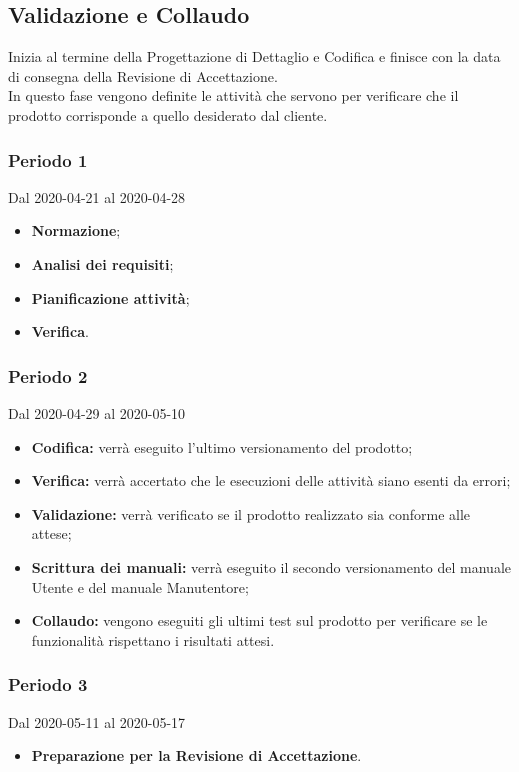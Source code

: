 \subsection{Validazione e Collaudo}
Inizia al termine della Progettazione di Dettaglio e Codifica e finisce con la data di consegna della Revisione di Accettazione.
\\In questo fase vengono definite le attività che servono per verificare che il prodotto corrisponde a quello desiderato dal cliente.
\subsubsection{Periodo 1} 
Dal 2020-04-21 al 2020-04-28
\begin{itemize}
	\item \textbf{Normazione};
	\item \textbf{Analisi dei requisiti};
	\item \textbf{Pianificazione attività};
	\item \textbf{Verifica}.
\end{itemize}
\subsubsection{Periodo 2} 
Dal 2020-04-29 al 2020-05-10
\begin{itemize}
	\item \textbf{Codifica:} verrà eseguito l'ultimo versionamento del prodotto;
	\item \textbf{Verifica:} verrà accertato che le esecuzioni delle attività siano esenti da errori;
	\item \textbf{Validazione:} verrà verificato se il prodotto realizzato sia conforme alle attese;
	\item \textbf{Scrittura dei manuali:} verrà eseguito il secondo versionamento del manuale Utente e del manuale Manutentore;
	\item \textbf{Collaudo:} vengono eseguiti gli ultimi test sul prodotto per verificare se le funzionalità rispettano i risultati attesi.
\end{itemize}
\subsubsection{Periodo 3} 
Dal 2020-05-11 al 2020-05-17
\begin{itemize}
	\item \textbf{Preparazione per la Revisione di Accettazione}.
\end{itemize}


